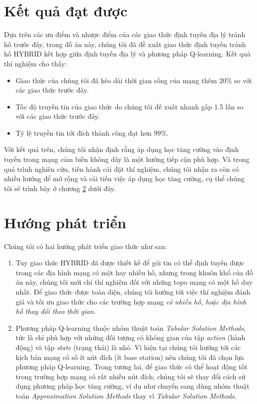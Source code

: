 \documentclass[12pt]{report}
\begin{document}
\section{Kết quả đạt được}
\label{sec:6.1}
Dựa trên các ưu điểm và nhược điểm của các giao thức định tuyến địa lý tránh hố trước đây, trong đồ án này, chúng tôi đã đề xuất giao thức định tuyến tránh hố HYBRID kết hợp giữa định tuyến địa lý và phương pháp Q-learning. Kết quả thí nghiệm cho thấy:
\begin{itemize} 
\item Giao thức của chúng tôi đã kéo dài thời gian sống của mạng thêm 20\% so với các giao thức trước đây.
\item Tốc độ truyền tin của giao thức do chúng tôi đề xuất nhanh gấp 1.5 lần so với các giao thức trước đây.
\item Tỷ lệ truyền tin tới đích thành công đạt hơn 99\%.
\end{itemize}
Với kết quả trên, chúng tôi nhận định rằng áp dụng học tăng cường vào định tuyến trong mạng cảm biến không dây là một hướng tiếp cận phù hợp. Và trong quá trình nghiên cứu, tiến hành cài đặt thí nghiệm, chúng tôi nhận ra còn có nhiều hướng để mở rộng và cải tiến việc áp dụng học tăng cường, cụ thể chúng tôi sẽ trình bày ở chương \ref{sec:6.2} dưới đây.
\section{Hướng phát triển}
\label{sec:6.2}
Chúng tôi có hai hướng phát triển giao thức như sau:
\begin{enumerate}
\item Tuy giao thức HYBRID đã được thiết kế để gói tin có thể định tuyến được trong các địa hình mạng có một hay nhiều hố, nhưng trong khuôn khổ của đồ án này, chúng tôi mới chỉ thí nghiệm đối với những topo mạng có một hố duy nhất. Để giao thức được toàn diện, chúng tôi hướng tới việc thí nghiệm đánh giá và tối ưu giao thức cho các trường hợp mạng \textit{có nhiều hố, hoặc địa hình hố thay đổi theo thời gian}.
\item Phương pháp Q-learning thuộc nhóm thuật toán \textit{Tabular Solution Methods}, tức là chỉ phù hợp với những đối tượng có không gian của tập \textit{action} (hành động) và tập \textit{state} (trạng thái) là nhỏ. Vì hiện tại chúng tôi hướng tới các kịch bản mạng có số ít nút đích (ít base station) nên chúng tôi đã chọn lựa phương pháp Q-learning. Trong tương lai, để giao thức có thể hoạt động tốt trong trường hợp mạng có rất nhiều nút đích, chúng tôi sẽ thay đổi cách sử dụng phương pháp học tăng cường, ví dụ như chuyển sang dùng nhóm thuật toán \textit{Approximation Solution Methods} thay vì \textit{Tabular Solution Methods}.
\end{enumerate}
\end{document}
